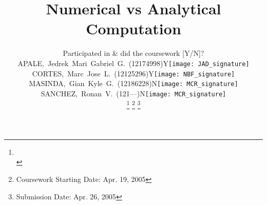 




\title{Numerical vs Analytical Computation} %

\author{
	{\small
	\begin{tabular}{l l l}
    & \multicolumn{2}{c}{\tiny \textcolor[rgb]{0.9,0.9,0.9}{Participated in \& did the coursework [Y/N]?}} 
    \\ 
		APALE,~Jedrek~Mari~Gabriel~G.~(12174998) & Y & \texttt{[image: JAD\_signature]}
		\\ 
		CORTES,~Marc~Jose~L.~(12125296)     & Y & \texttt{[image: NBF\_signature]}
		\\ 
		MASINDA,~Gian~Kyle~G.~(12186228)  & N & \texttt{[image: MCR\_signature]}
		\\ 
        SANCHEZ,~Ronan~V.~(121---)  & N & \texttt{[image: MCR\_signature]}
		\\ 
	\end{tabular}
	}
\thanks{\CrmD\protect\\} %
 \thanks{Coursework Starting Date: \hspace{1ex} Apr. 19, 2005}
\thanks{Submission Date: \hspace{1ex} Apr. 26, 2005}} 

%
{} %


